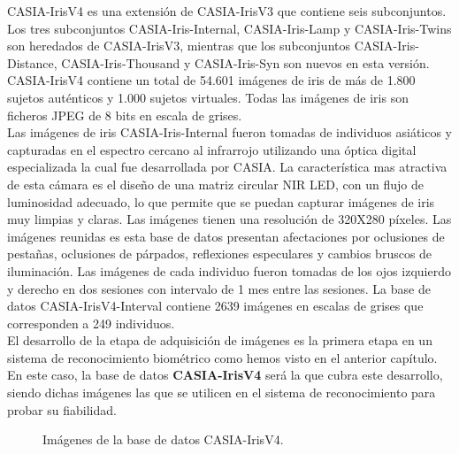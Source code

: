 CASIA-IrisV4 es una extensión de CASIA-IrisV3 que contiene seis subconjuntos. Los tres subconjuntos CASIA-Iris-Internal, CASIA-Iris-Lamp y CASIA-Iris-Twins son heredados de CASIA-IrisV3, mientras que los subconjuntos CASIA-Iris-Distance, CASIA-Iris-Thousand y CASIA-Iris-Syn son nuevos en esta versión. \\

CASIA-IrisV4 contiene un total de 54.601 imágenes de iris de más de 1.800 sujetos auténticos y 1.000 sujetos virtuales. Todas las imágenes de iris son ficheros JPEG de 8 bits en escala de grises. \\

Las imágenes de iris CASIA-Iris-Internal fueron tomadas de individuos asiáticos y capturadas en el espectro cercano al infrarrojo utilizando una óptica digital especializada la cual fue desarrollada por CASIA. La característica mas atractiva de esta cámara es el diseño de una matriz circular NIR LED, con un flujo de luminosidad adecuado, lo que permite que se puedan capturar imágenes de iris muy limpias y claras. Las imágenes tienen una resolución de 320X280 píxeles. Las imágenes reunidas es esta base de datos presentan afectaciones por oclusiones de pestañas, oclusiones de párpados, reflexiones especulares y cambios bruscos de iluminación. Las imágenes de cada individuo fueron tomadas de los ojos izquierdo y derecho en dos sesiones con intervalo de 1 mes entre las sesiones. La base de datos CASIA-IrisV4-Interval contiene 2639 imágenes en escalas de grises que corresponden a 249 individuos. \\

El desarrollo de la etapa de adquisición de imágenes es la primera etapa en un sistema de reconocimiento biométrico como hemos visto en el anterior capítulo. En este caso, la base de datos \textbf{CASIA-IrisV4} será la que cubra este desarrollo, siendo dichas imágenes las que se utilicen en el sistema de reconocimiento para probar su fiabilidad. \\

\begin{figure}[htbp]
\centering
{}
\caption{Imágenes de la base de datos CASIA-IrisV4.} \label{fig:señales}
\end{figure}

